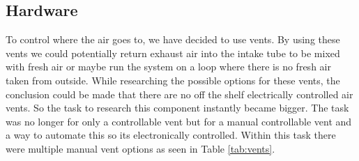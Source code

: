 \documentclass[a4paper,oneside]{book}
\begin{document}
\subsection{Hardware}
To control where the air goes to, we have decided to use vents. By using these
vents we could potentially return exhaust air into the intake tube to be mixed
with fresh air or maybe run the system on a loop where there is no fresh air
taken from outside. While researching the possible options for these vents, the
conclusion could be made that there are no off the shelf electrically
controlled air vents. So the task to research this component instantly became
bigger. The task was no longer for only a controllable vent but for a manual
controllable vent and a way to automate this so its electronically controlled.
Within this task there were multiple manual vent options as seen in Table
\ref{tab:vents}.
\end{document}
